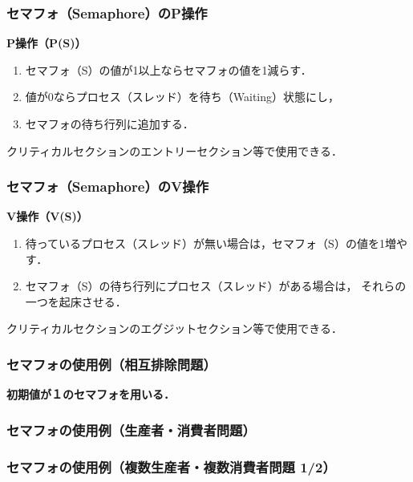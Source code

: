 \documentclass{beamer}                   %
\begin{document}
\begin{frame}
  \frametitle{セマフォ（Semaphore）のP操作}
  {\bf P操作（P(S)）}
  \begin{enumerate}
  \item セマフォ（S）の値が1以上ならセマフォの値を1減らす．
  \item 値が0ならプロセス（スレッド）を待ち（Waiting）状態にし，
  \item セマフォの待ち行列に追加する．
  \end{enumerate}
  クリティカルセクションのエントリーセクション等で使用できる．

  \begin{center}
    \begin{minipage}{0.6\columnwidth}
      
    \end{minipage}
  \end{center}
\end{frame}

\begin{frame}
  \frametitle{セマフォ（Semaphore）のV操作}
  {\bf V操作（V(S)）}
  \begin{enumerate}
  \item 待っているプロセス（スレッド）が無い場合は，セマフォ（S）の値を1増やす．
  \item セマフォ（S）の待ち行列にプロセス（スレッド）がある場合は，
    それらの一つを起床させる．
  \end{enumerate}
  クリティカルセクションのエグジットセクション等で使用できる．

  \begin{center}
    \begin{minipage}{0.6\columnwidth}
      
    \end{minipage}
  \end{center}
\end{frame}

\begin{frame}
  \frametitle{セマフォの使用例（相互排除問題）}
  
  {\bf 初期値が１のセマフォを用いる．}
\end{frame}

\begin{frame}
  \frametitle{セマフォの使用例（生産者・消費者問題）}
  
\end{frame}

\begin{frame}
  \frametitle{セマフォの使用例（複数生産者・複数消費者問題 1/2）}
  
\end{frame}
\end{document}
